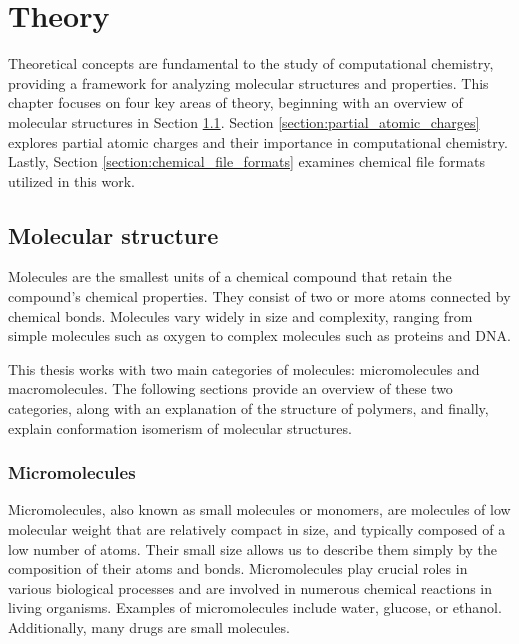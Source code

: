 \documentclass[
  digital,     %
  oneside,     %
  nosansbold,  %
  nocolorbold, %
  lof,         %
  lot,         %
]{fithesis4}
\begin{document}
\clearpage
\newpage

\chapter{Theory}
\label{chapter:theory}

Theoretical concepts are fundamental to the study of computational chemistry, providing a framework for analyzing molecular structures and properties. This chapter focuses on four key areas of theory, beginning with an overview of molecular structures in Section \ref{section:molecular_structure}. Section \ref{section:partial_atomic_charges} explores partial atomic charges and their importance in computational chemistry. Lastly, Section \ref{section:chemical_file_formats} examines chemical file formats utilized in this work.

\section{Molecular structure}
\label{section:molecular_structure}

Molecules are the smallest units of a chemical compound that retain the compound's chemical properties. They consist of two or more atoms connected by chemical bonds. Molecules vary widely in size and complexity, ranging from simple molecules such as oxygen to complex molecules such as proteins and DNA. \cite{britannica_molecule}

This thesis works with two main categories of molecules: micromolecules and macromolecules. The following sections provide an overview of these two categories, along with an explanation of the structure of polymers, and finally, explain conformation isomerism of molecular structures.

\subsection{Micromolecules}

Micromolecules, also known as small molecules or monomers, are molecules of low molecular weight that are relatively compact in size, and typically composed of a low number of atoms. Their small size allows us to describe them simply by the composition of their atoms and bonds. Micromolecules play crucial roles in various biological processes and are involved in numerous chemical reactions in living organisms. \cite{clark2018biology,micromolecule_definition} Examples of micromolecules include water, glucose, or ethanol. Additionally, many drugs are small molecules. \cite{smallmoleculewiki}
\end{document}

